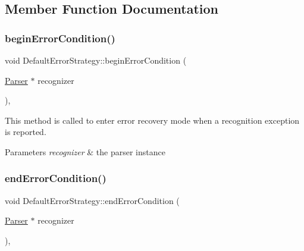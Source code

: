 \subsection{Member Function Documentation}
\mbox{\label{classantlr4_1_1DefaultErrorStrategy_a6408837d5375351acbcd1595c8d5ab79}} 
\subsubsection{\texorpdfstring{begin\+Error\+Condition()}{beginErrorCondition()}}
{\footnotesize\ttfamily void Default\+Error\+Strategy\+::begin\+Error\+Condition (\begin{DoxyParamCaption}\item[{\hyperlink{classantlr4_1_1Parser}{Parser} $\ast$}]{recognizer }\end{DoxyParamCaption})\hspace{0.3cm}{\ttfamily [protected]}, {\ttfamily [virtual]}}



This method is called to enter error recovery mode when a recognition exception is reported. 


\begin{DoxyParams}{Parameters}
{\em recognizer} & the parser instance \\
\hline
\end{DoxyParams}
\mbox{\label{classantlr4_1_1DefaultErrorStrategy_ae04080b08ef36ab9586fe2273ce960f0}} 
\subsubsection{\texorpdfstring{end\+Error\+Condition()}{endErrorCondition()}}
{\footnotesize\ttfamily void Default\+Error\+Strategy\+::end\+Error\+Condition (\begin{DoxyParamCaption}\item[{\hyperlink{classantlr4_1_1Parser}{Parser} $\ast$}]{recognizer }\end{DoxyParamCaption})\hspace{0.3cm}{\ttfamily [protected]}, {\ttfamily [virtual]}}



